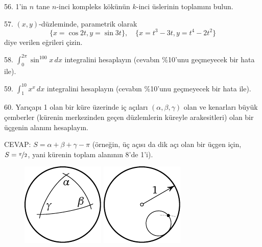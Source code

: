 \begin{problem}{56.}
	1'in $n$ tane $n$-inci kompleks kökünün $k$-inci üslerinin  toplamını bulun.
\end{problem}

\begin{problem}{57.}
	$(x,y)$-düzleminde, parametrik olarak
	\begin{equation*}
		\{x=\cos 2t, y=\sin 3t\},\quad
		\{x=t^3-3t, y=t^4-2t^2\}
	\end{equation*}
diye verilen eğrileri çizin.
\end{problem}

\begin{problem}{58.}
	$\int_0^{2\pi} \sin^{100} x\,dx$  integralini hesaplayın (cevabın \%10'unu geç\-me\-ye\-cek bir hata ile).
\end{problem}

\begin{problem}{59.}
	$\int_1^{10} x^x\,dx$ integralini hesaplayın (cevabın \%10'unu geçmeyecek bir hata ile).
\end{problem}

\begin{problem}{60.}
	Yarıçapı 1 olan bir küre üzerinde iç açıları $(\alpha, \beta, \gamma)$ olan ve 
	kenarları büyük çemberler (kürenin merkezinden geçen düzlemlerin küreyle arakesitleri) olan bir üçgenin alanını hesaplayın.

	\begin{note}{CEVAP:}
		$S=\alpha+\beta+\gamma-\pi$ (örneğin, üç açısı da dik açı olan bir üçgen için, $S=\nicefrac{\pi}{2}$, yani kürenin toplam alanının 8'de 1'i).
		\begin{figure}
			\null\hfill
			\includegraphics{resources/taskbook-44}
			\hfill
			\includegraphics{resources/taskbook-45}
			\hfill\null
		\end{figure}
	\end{note}
\end{problem}

